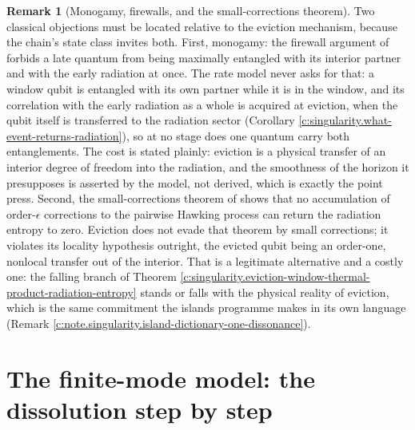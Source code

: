 \documentclass[11pt]{article}
\theoremstyle{definition}
\newtheorem{remark}[theorem]{Remark}
\theoremstyle{plain}
\begin{document}
\begin{remark}[Monogamy, firewalls, and the small-corrections theorem]\label{c:note.singularity.monogamy-firewalls-small-corrections-theorem}
Two classical objections must be located relative to the eviction mechanism, because the chain's state class invites both. First, monogamy: the firewall argument of \cite{AMPS2013} forbids a late quantum from being maximally entangled with its interior partner and with the early radiation at once. The rate model never asks for that: a window qubit is entangled with its own partner while it is in the window, and its correlation with the early radiation as a whole is acquired at eviction, when the qubit itself is transferred to the radiation sector (Corollary \ref{c:singularity.what-event-returns-radiation}), so at no stage does one quantum carry both entanglements. The cost is stated plainly: eviction is a physical transfer of an interior degree of freedom into the radiation, and the smoothness of the horizon it presupposes is asserted by the model, not derived, which is exactly the point \cite{AMPS2013} press. Second, the small-corrections theorem of \cite{Mathur2009} shows that no accumulation of order-$\epsilon$ corrections to the pairwise Hawking process can return the radiation entropy to zero. Eviction does not evade that theorem by small corrections; it violates its locality hypothesis outright, the evicted qubit being an order-one, nonlocal transfer out of the interior. That is a legitimate alternative and a costly one: the falling branch of Theorem \ref{c:singularity.eviction-window-thermal-product-radiation-entropy} stands or falls with the physical reality of eviction, which is the same commitment the islands programme makes in its own language (Remark \ref{c:note.singularity.island-dictionary-one-dissonance}).
\end{remark}

\section{The finite-mode model: the dissolution step by step}
\end{document}
